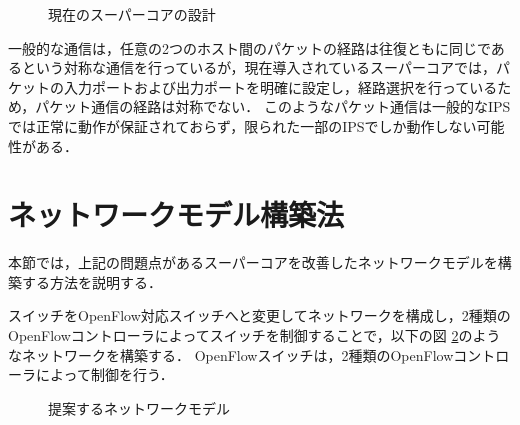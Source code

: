 \begin{figure}[tb]
\begin{center}
\caption{現在のスーパーコアの設計}
\label{fig:3-0}
\end{center}
\end{figure}

一般的な通信は，任意の2つのホスト間のパケットの経路は往復ともに同じであるという対称な通信を行っているが，現在導入されているスーパーコアでは，パケットの入力ポートおよび出力ポートを明確に設定し，経路選択を行っているため，パケット通信の経路は対称でない．
このようなパケット通信は一般的なIPSでは正常に動作が保証されておらず，限られた一部のIPSでしか動作しない可能性がある．

\section{ネットワークモデル構築法}

本節では，上記の問題点があるスーパーコアを改善したネットワークモデルを構築する方法を説明する．

スイッチをOpenFlow対応スイッチへと変更してネットワークを構成し，2種類のOpenFlowコントローラによってスイッチを制御することで，以下の図 \ref{fig:3-1}のようなネットワークを構築する．
OpenFlowスイッチは，2種類のOpenFlowコントローラによって制御を行う．

\begin{figure}[tb]
\begin{center}
\caption{提案するネットワークモデル}
\label{fig:3-1}
\end{center}
\end{figure}

